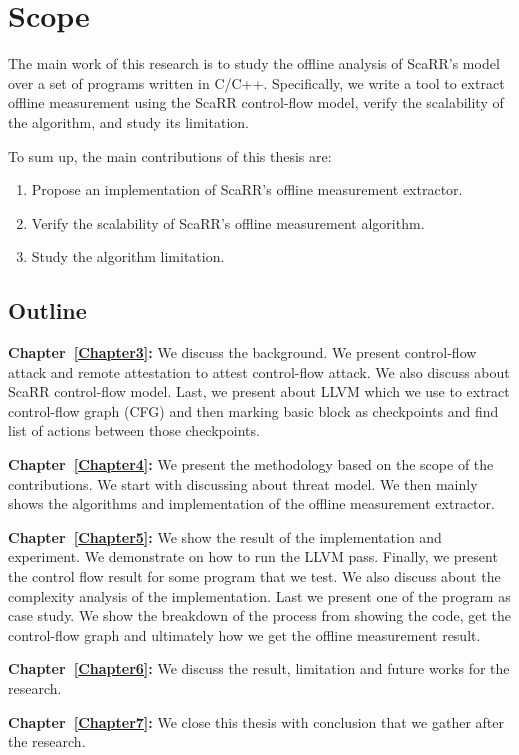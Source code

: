 
\chapter{Scope} %
\label{Chapter2} %

The main work of this research is to study the offline analysis of ScaRR's
model~\cite{toffaliniScaRRScalableRuntime2019} over a set of programs written in
C/C++. Specifically, we write a tool to extract offline measurement using the
ScaRR control-flow model, verify the scalability of the algorithm, and study its
limitation.

To sum up, the main contributions of this thesis are:
\begin{enumerate}
	\item Propose an implementation of ScaRR's offline measurement extractor.
	\item Verify the scalability of ScaRR's offline measurement algorithm.
	\item Study the algorithm limitation.
\end{enumerate}

\section{Outline}
\label{sec:outline}

\vspace{0.5cm}
\noindent \textbf{Chapter~\ref{Chapter3}:} We discuss the background. We present
control-flow attack and remote attestation to attest control-flow attack. We
also discuss about ScaRR control-flow model. Last, we present about LLVM which
we use to extract control-flow graph (CFG) and then marking basic block as
checkpoints and find list of actions between those checkpoints.

\vspace{0.5cm}
\noindent \textbf{Chapter~\ref{Chapter4}:} We present the methodology based on
the scope of the contributions. We start with discussing about threat model. We
then mainly shows the algorithms and implementation of the offline measurement
extractor.

\vspace{0.5cm}
\noindent \textbf{Chapter~\ref{Chapter5}:} We show the result of the
implementation and experiment. We demonstrate on how to run the LLVM pass.
Finally, we present the control flow result for some program that we test. We
also discuss about the complexity analysis of the implementation. Last we
present one of the program as case study. We show the breakdown of the process
from showing the code, get the control-flow graph and ultimately how we get the
offline measurement result.

\vspace{0.5cm}
\noindent \textbf{Chapter~\ref{Chapter6}:} We discuss the result, limitation and
future works for the research.

\vspace{0.5cm}
\noindent \textbf{Chapter~\ref{Chapter7}:} We close this thesis with conclusion
that we gather after the research.
